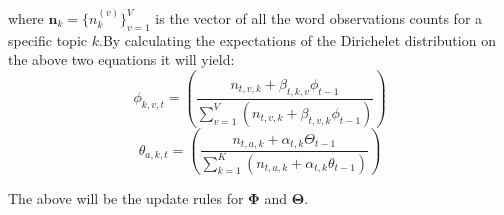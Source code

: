 where $\boldsymbol{n}_k = \{n_k^{(v)}\}_{v=1}^V$ is the vector of all the word observations counts for a specific topic $k$.By calculating the expectations of the Dirichelet distribution on the above two equations it will yield:
\begin{equation}\label{dat_phi}
\phi_{k,v,t} = \left(\frac{n_{t,v,k}+\beta_{t,k,v}\phi_{t-1}}{\sum_{v=1}^V \left(n_{t,v,k}+\beta_{t,v,k}\phi_{t-1} \right) } \right) 
\end{equation}
\begin{equation}\label{dat_theta}
\theta_{a,k,t} = \left(\frac{n_{t,a,k}+\alpha_{t,k} \Theta_{t-1}}{\sum_{k=1}^K \left(n_{t,a,k}+\alpha_{t,k}\theta_{t-1} \right) } \right)
\end{equation}

The above will be the update rules for $\boldsymbol{\Phi}$ and $\boldsymbol{\Theta}$.


